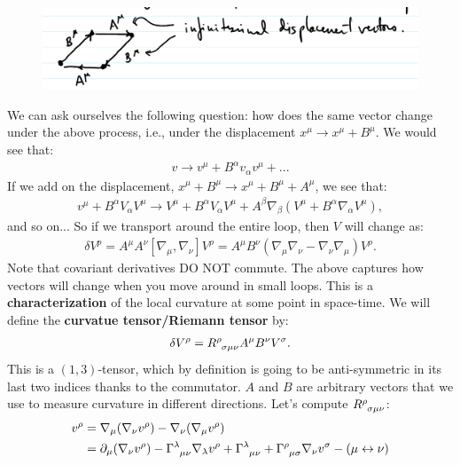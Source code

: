 \documentclass[11pt]{article}
\newcommand{\riemanntensor}[0]{\tensor{R}{^\rho_{\sigma \mu \nu}}}
\theoremstyle{definition}
\begin{document}
\begin{figure}[H]
	\centering 
	\includegraphics[width=15cm]{parallel-transport.png}
\end{figure}

We can ask ourselves the following question: how does the same vector change under the above process, i.e., under the displacement \( x^\mu \rightarrow x^\mu + B^\mu \). We would see that:
\begin{align*}
	v \rightarrow v^\mu + B^\alpha v_\alpha v^\mu + ... 
\end{align*}
If we add on the displacement, \( x^\mu + B^\mu \rightarrow x^\mu + B^\mu + A^\mu \), we see that: 
\begin{align*}
	 v^\mu + B^\alpha V_\alpha V^\mu \rightarrow V^\mu + B^\alpha V_\alpha V^\mu + A^\beta \nabla_\beta ( V^\mu + B^\alpha \nabla_\alpha V^\mu), 
\end{align*}
and so on...
\newline 
\newline
So if we transport around the entire loop, then \( V \) will change as: 
\begin{align}
	\delta V^p = A^\mu A^\nu [ \nabla_\mu, \nabla_\nu ] V^\rho = A^\mu B^\nu ( \nabla_\mu \nabla_\nu - \nabla_\nu \nabla_\mu ) V^\rho. 	
\end{align}
Note that covariant derivatives DO NOT commute. The above captures how vectors will change when you move around in small loops. This is a \textbf{characterization} of the local curvature at some point in space-time. We will define the \textbf{curvatue tensor/Riemann tensor} by:
\begin{align}
	\delta V^\rho = \tensor{R}{^\rho_{\sigma \mu \nu}}	 A^\mu B^\nu V^\sigma. 
\end{align}
This is a \( (1,3)\)-tensor, which by definition is going to be anti-symmetric in its last two indices thanks to the commutator. \( A \) and \( B \) are arbitrary vectors that we use to measure curvature in different directions. Let's compute \( \riemanntensor \):
\begin{align*}
	[ \nabla_\mu, \nabla_\nu ] v^\rho & = \nabla_\mu ( \nabla_\nu v^\rho) - \nabla_\nu ( \nabla_\mu v^\rho ) \\
	& = \partial_\mu ( \nabla_\nu v^\rho) - \tensor{\Gamma}{^\lambda_{\mu \nu}} \nabla_\lambda v^\rho + \tensor{\Gamma}{^\lambda_{\mu \nu}} + \tensor{\Gamma}{^\rho_{\mu \sigma}} \nabla_\nu v^\sigma - ( \mu \leftrightarrow \nu ) 
\end{align*}
\end{document}
